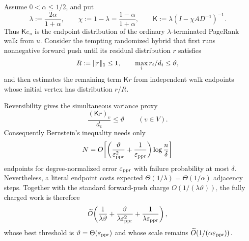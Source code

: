 \begin{proposition}
\label{prop:aesp-cd-point-source-literal-walk-sampling-stop}
Assume \(0<\alpha\leq1/2\), and put
\begin{equation*}
 \lambda:=\frac{2\alpha}{1+\alpha},
 \qquad
 \chi:=1-\lambda=\frac{1-\alpha}{1+\alpha},
 \qquad
 \mathsf K:=\lambda(I-\chi AD^{-1})^{-1}.
\end{equation*}
Thus \(\mathsf K e_u\) is the endpoint distribution of the ordinary
\(\lambda\)-terminated PageRank walk from \(u\).  Consider the tempting
randomized hybrid that first runs nonnegative forward push until its residual
distribution \(r\) satisfies
\begin{equation*}
 R:=\lVert r\rVert_1\leq1,
 \qquad
 \max_i r_i/d_i\leq\vartheta,
\end{equation*}
and then estimates the remaining term \(\mathsf K r\) from independent walk
endpoints whose initial vertex has distribution \(r/R\).

Reversibility gives the simultaneous variance proxy
\begin{equation}
 \frac{(\mathsf K r)_v}{d_v}\leq\vartheta
 \qquad(v\in V).
 \label{eq:aesp-cd-forward-walk-variance-proxy}
\end{equation}
Consequently Bernstein's inequality needs only
\begin{equation*}
 N=O\!\left[
  \left(\frac{\vartheta}{\varepsilon_{\mathrm{ppr}}^2}
       +\frac1{\varepsilon_{\mathrm{ppr}}}\right)
  \log\frac n\delta
 \right]
\end{equation*}
endpoints for degree-normalized error \(\varepsilon_{\mathrm{ppr}}\) with failure probability
at most \(\delta\).  Nevertheless, a literal endpoint costs expected
\(\Theta(1/\lambda)=\Theta(1/\alpha)\) adjacency steps.  Together with the
standard forward-push charge \(O(1/(\lambda\vartheta))\), the fully charged
work is therefore
\begin{equation}
 \widetilde O\!\left(
   \frac1{\lambda\vartheta}
  +\frac{\vartheta}{\lambda\varepsilon_{\mathrm{ppr}}^2}
  +\frac1{\lambda\varepsilon_{\mathrm{ppr}}}
 \right),
 \label{eq:aesp-cd-forward-literal-walk-work}
\end{equation}
whose best threshold is \(\vartheta=\Theta(\varepsilon_{\mathrm{ppr}})\) and whose scale remains
\(\widetilde O(1/(\alpha\varepsilon_{\mathrm{ppr}}))\).


\end{proposition}
